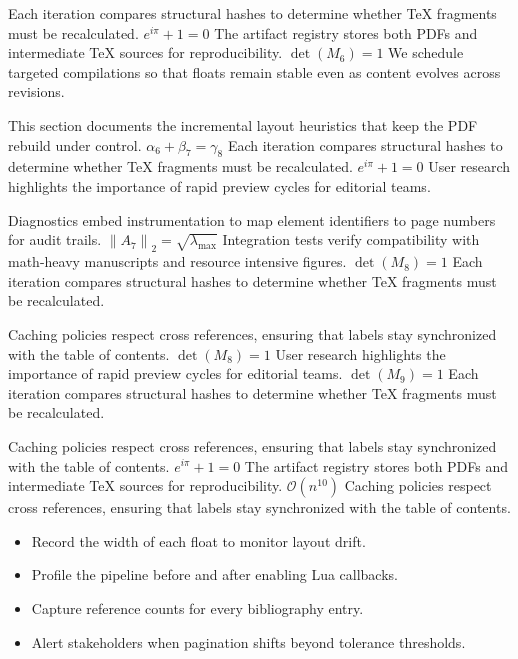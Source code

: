 \documentclass[12pt,a4paper,twocolumn]{article}
\newcommand{\paraid}[1]{\par\noindent\hypertarget{#1}{\ignorespaces}}
\begin{document}
\paraid{sec2-p3}Each iteration compares structural hashes to determine whether TeX fragments must be recalculated. $e^{i\pi} + 1 = 0$ The artifact registry stores both PDFs and intermediate TeX sources for reproducibility. $\det(M_{6}) = 1$ We schedule targeted compilations so that floats remain stable even as content evolves across revisions.
\par

\paraid{sec2-p4}This section documents the incremental layout heuristics that keep the PDF rebuild under control. $\alpha_{6} + \beta_{7} = \gamma_{8}$ Each iteration compares structural hashes to determine whether TeX fragments must be recalculated. $e^{i\pi} + 1 = 0$ User research highlights the importance of rapid preview cycles for editorial teams.
\par

\paraid{sec2-p5}Diagnostics embed instrumentation to map element identifiers to page numbers for audit trails. $\left\|A_{7}\right\|_{2} = \sqrt{\lambda_{\max}}$ Integration tests verify compatibility with math-heavy manuscripts and resource intensive figures. $\det(M_{8}) = 1$ Each iteration compares structural hashes to determine whether TeX fragments must be recalculated.
\par

\paraid{sec2-p6}Caching policies respect cross references, ensuring that labels stay synchronized with the table of contents. $\det(M_{8}) = 1$ User research highlights the importance of rapid preview cycles for editorial teams. $\det(M_{9}) = 1$ Each iteration compares structural hashes to determine whether TeX fragments must be recalculated.
\par

\paraid{sec2-p7}Caching policies respect cross references, ensuring that labels stay synchronized with the table of contents. $e^{i\pi} + 1 = 0$ The artifact registry stores both PDFs and intermediate TeX sources for reproducibility. $\mathcal{O}(n^{10})$ Caching policies respect cross references, ensuring that labels stay synchronized with the table of contents.
\par

\begin{itemize}

\item 
        Record the width of each float to monitor layout drift.
      

\item 
        Profile the pipeline before and after enabling Lua callbacks.
      

\item 
        Capture reference counts for every bibliography entry.
      

\item 
        Alert stakeholders when pagination shifts beyond tolerance thresholds.
      

\end{itemize}
\end{document}
